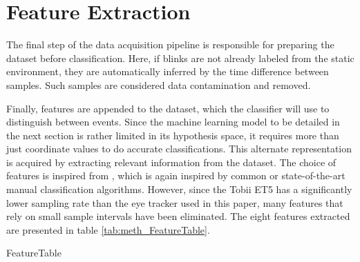\section{Feature Extraction} \label{sec:meth_FeatureGeneration}


The final step of the data acquisition pipeline is responsible for preparing the dataset before classification. Here, if blinks are not already labeled from the static environment, they are automatically inferred by the time difference between samples. Such samples are considered data contamination and removed.

Finally, features are appended to the dataset, which the classifier will use to distinguish between events. Since the machine learning model to be detailed in the next section is rather limited in its hypothesis space, it requires more than just coordinate values to do accurate classifications. This alternate representation is acquired by extracting relevant information from the dataset. The choice of features is inspired from \cite{zemblys2018}, which is again inspired by common or state-of-the-art manual classification algorithms. However, since the Tobii ET5 has a significantly lower sampling rate than the eye tracker used in this paper, many features that rely on small sample intervals have been eliminated. The eight features extracted are presented in table \ref{tab:meth_FeatureTable}.

{FeatureTable}